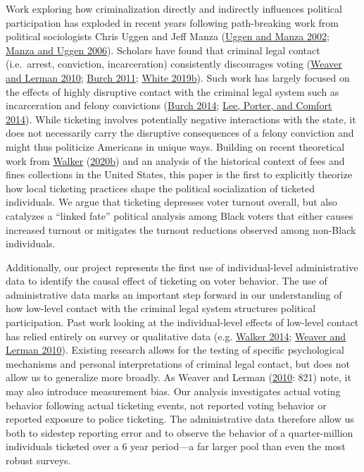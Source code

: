 \documentclass[
  12pt,
]{article}
\begin{document}
Work exploring how criminalization directly and indirectly influences political participation has exploded in recent years following path-breaking work from political sociologists Chris Uggen and Jeff Manza (\protect\hyperlink{ref-Uggen2002}{Uggen and Manza 2002}; \protect\hyperlink{ref-Manza2006}{Manza and Uggen 2006}). Scholars have found that criminal legal contact (i.e.~arrest, conviction, incarceration) consistently discourages voting (\protect\hyperlink{ref-Weaver2010}{Weaver and Lerman 2010}; \protect\hyperlink{ref-Burch2011}{Burch 2011}; \protect\hyperlink{ref-White2019a}{White 2019b}). Such work has largely focused on the effects of highly disruptive contact with the criminal legal system such as incarceration and felony convictions (\protect\hyperlink{ref-Burch2014}{Burch 2014}; \protect\hyperlink{ref-Lee2014}{Lee, Porter, and Comfort 2014}). While ticketing involves potentially negative interactions with the state, it does not necessarily carry the disruptive consequences of a felony conviction and might thus politicize Americans in unique ways. Building on recent theoretical work from \protect\hyperlink{ref-Walker2020a}{Walker} (\protect\hyperlink{ref-Walker2020a}{2020b}) and an analysis of the historical context of fees and fines collections in the United States, this paper is the first to explicitly theorize how local ticketing practices shape the political socialization of ticketed individuals. We argue that ticketing depresses voter turnout overall, but also catalyzes a ``linked fate'' political analysis among Black voters that either causes increased turnout or mitigates the turnout reductions observed among non-Black individuals.

Additionally, our project represents the first use of individual-level administrative data to identify the causal effect of ticketing on voter behavior. The use of administrative data marks an important step forward in our understanding of how low-level contact with the criminal legal system structures political participation. Past work looking at the individual-level effects of low-level contact has relied entirely on survey or qualitative data (e.g. \protect\hyperlink{ref-Walker2014}{Walker 2014}; \protect\hyperlink{ref-Weaver2010}{Weaver and Lerman 2010}). Existing research allows for the testing of specific psychological mechanisms and personal interpretations of criminal legal contact, but does not allow us to generalize more broadly. As Weaver and Lerman (\protect\hyperlink{ref-Weaver2010}{2010}: 821) note, it may also introduce measurement bias. Our analysis investigates actual voting behavior following actual ticketing events, not reported voting behavior or reported exposure to police ticketing. The administrative data therefore allow us both to sidestep reporting error and to observe the behavior of a quarter-million individuals ticketed over a 6 year period---a far larger pool than even the most robust surveys.
\end{document}
